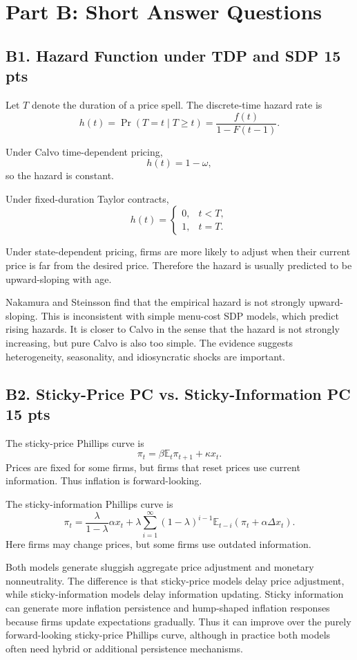 \documentclass[11pt]{article}
\begin{document}
\clearpage
\section*{Part B: Short Answer Questions}

\subsection*{B1. Hazard Function under TDP and SDP \hfill 15 pts}

Let \(T\) denote the duration of a price spell. The discrete-time hazard rate is
\[
h(t)=\Pr(T=t\mid T\geq t)
=
\frac{f(t)}{1-F(t-1)}.
\]

Under Calvo time-dependent pricing,
\[
h(t)=1-\omega,
\]
so the hazard is constant.

Under fixed-duration Taylor contracts,
\[
h(t)=
\begin{cases}
0, & t<T,\\
1, & t=T.
\end{cases}
\]

Under state-dependent pricing, firms are more likely to adjust when their current price is far from the desired price. Therefore the hazard is usually predicted to be upward-sloping with age.

Nakamura and Steinsson find that the empirical hazard is not strongly upward-sloping. This is inconsistent with simple menu-cost SDP models, which predict rising hazards. It is closer to Calvo in the sense that the hazard is not strongly increasing, but pure Calvo is also too simple. The evidence suggests heterogeneity, seasonality, and idiosyncratic shocks are important.

\clearpage
\subsection*{B2. Sticky-Price PC vs. Sticky-Information PC \hfill 15 pts}

The sticky-price Phillips curve is
\[
\pi_t=\beta \mathbb{E}_t\pi_{t+1}+\kappa x_t.
\]
Prices are fixed for some firms, but firms that reset prices use current information. Thus inflation is forward-looking.

The sticky-information Phillips curve is
\[
\pi_t
=
\frac{\lambda}{1-\lambda}\alpha x_t
+
\lambda\sum_{i=1}^{\infty}(1-\lambda)^{i-1}
\mathbb{E}_{t-i}\left(\pi_t+\alpha\Delta x_t\right).
\]
Here firms may change prices, but some firms use outdated information.

Both models generate sluggish aggregate price adjustment and monetary nonneutrality. The difference is that sticky-price models delay price adjustment, while sticky-information models delay information updating. Sticky information can generate more inflation persistence and hump-shaped inflation responses because firms update expectations gradually. Thus it can improve over the purely forward-looking sticky-price Phillips curve, although in practice both models often need hybrid or additional persistence mechanisms.
\end{document}
